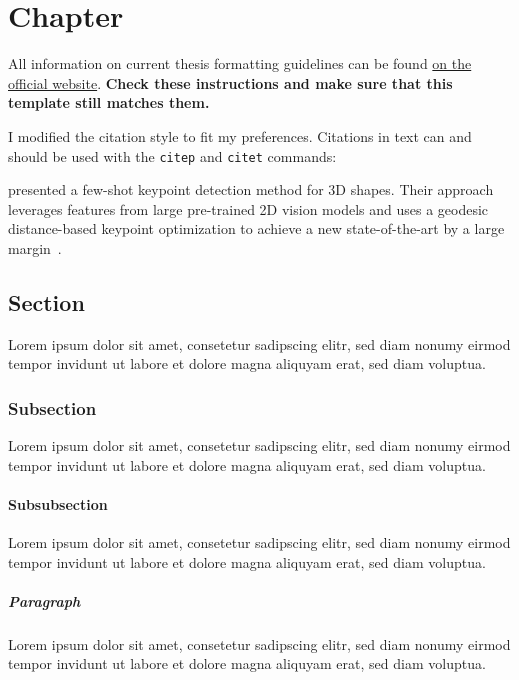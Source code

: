\documentclass[a4paper,11pt,oneside]{book}
\begin{document}


\chapter{Chapter}
All information on current thesis formatting guidelines can be found \href{https://www.cit.tum.de/en/cit/studies/students/thesis-completing-your-studies/informatics/}{on the official website}. \textbf{Check these instructions and make sure that this template still matches them.}

I modified the citation style to fit my preferences. Citations in text can and should be used with the \texttt{citep} and \texttt{citet} commands:

\citet{wimmer2024back} presented a few-shot keypoint detection method for 3D shapes. Their approach leverages features from large pre-trained 2D vision models and uses a geodesic distance-based keypoint optimization to achieve a new state-of-the-art by a large margin~\citep{wimmer2024back}.


\section{Section}
Lorem ipsum dolor sit amet, consetetur sadipscing elitr, sed diam nonumy eirmod tempor invidunt ut labore et dolore magna aliquyam erat, sed diam voluptua. 
\subsection{Subsection}
Lorem ipsum dolor sit amet, consetetur sadipscing elitr, sed diam nonumy eirmod tempor invidunt ut labore et dolore magna aliquyam erat, sed diam voluptua. 
\subsubsection{Subsubsection}
Lorem ipsum dolor sit amet, consetetur sadipscing elitr, sed diam nonumy eirmod tempor invidunt ut labore et dolore magna aliquyam erat, sed diam voluptua. 
\paragraph{Paragraph}
Lorem ipsum dolor sit amet, consetetur sadipscing elitr, sed diam nonumy eirmod tempor invidunt ut labore et dolore magna aliquyam erat, sed diam voluptua.

\end{document}
